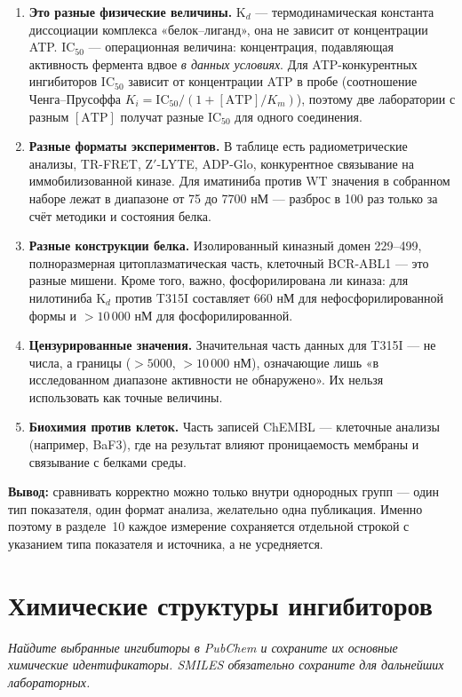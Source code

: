 \documentclass[11pt,a4paper]{article}
\newcommand{\instr}[1]{{\small\itshape #1\par}}
\begin{document}
\begin{enumerate}[leftmargin=*,topsep=2pt,itemsep=3pt]
\item \textbf{Это разные физические величины.} K$_d$ --- термодинамическая константа
диссоциации комплекса «белок--лиганд», она не зависит от концентрации ATP. IC$_{50}$ ---
операционная величина: концентрация, подавляющая активность фермента вдвое \emph{в данных
условиях}. Для ATP-конкурентных ингибиторов IC$_{50}$ зависит от концентрации ATP в пробе
(соотношение Ченга--Прусоффа $K_i = \mathrm{IC}_{50}/(1 + [\mathrm{ATP}]/K_m)$), поэтому
две лаборатории с разным $[\mathrm{ATP}]$ получат разные IC$_{50}$ для одного соединения.
\item \textbf{Разные форматы экспериментов.} В таблице есть радиометрические анализы,
TR-FRET, Z$'$-LYTE, ADP-Glo, конкурентное связывание на иммобилизованной киназе. Для
иматиниба против WT значения в собранном наборе лежат в диапазоне от 75 до 7700 нМ ---
разброс в 100 раз только за счёт методики и состояния белка.
\item \textbf{Разные конструкции белка.} Изолированный киназный домен 229--499,
полноразмерная цитоплазматическая часть, клеточный BCR-ABL1 --- это разные мишени. Кроме
того, важно, фосфорилирована ли киназа: для нилотиниба K$_d$ против T315I составляет
660 нМ для нефосфорилированной формы и $>10\,000$ нМ для фосфорилированной.
\item \textbf{Цензурированные значения.} Значительная часть данных для T315I --- не
числа, а границы ($>5000$, $>10\,000$ нМ), означающие лишь «в исследованном диапазоне
активности не обнаружено». Их нельзя использовать как точные величины.
\item \textbf{Биохимия против клеток.} Часть записей ChEMBL --- клеточные анализы
(например, BaF3), где на результат влияют проницаемость мембраны и связывание с белками
среды.
\end{enumerate}

\textbf{Вывод:} сравнивать корректно можно только внутри однородных групп --- один тип
показателя, один формат анализа, желательно одна публикация. Именно поэтому в разделе~10
каждое измерение сохраняется отдельной строкой с указанием типа показателя и источника,
а не усредняется.

\section{Химические структуры ингибиторов}
\instr{Найдите выбранные ингибиторы в PubChem и сохраните их основные химические
идентификаторы. SMILES обязательно сохраните для дальнейших лабораторных.}
\end{document}
